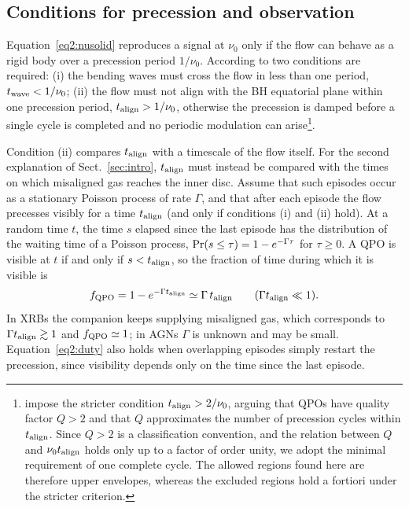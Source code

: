 \subsection{Conditions for precession and observation}
\label{sec:cond}

Equation~\eqref{eq2:nusolid} reproduces a signal at $\nu_0$ only if the flow can behave as a rigid body over a precession period $1/\nu_0$.
According to \citet{Motta2017} two conditions are required: 
(i) the bending waves must cross the flow in less than one period, $t_\textup{wave}<1/\nu_0$; 
(ii) the flow must not align with the BH equatorial plane within one precession period, $t_\textup{align}>1/\nu_0$, otherwise the precession is damped before a single cycle is completed and no periodic modulation can arise\footnote{\citet{Motta2017} impose the stricter condition $t_\textup{align}>2/\nu_0$, arguing that QPOs have quality factor $Q>2$ and that $Q$ approximates the number of precession cycles within $t_\textup{align}$. Since $Q>2$ is a classification convention, and the relation between $Q$ and $\nu_0 t_\textup{align}$ holds only up to a factor of order unity, we adopt the minimal requirement of one complete cycle. The allowed regions found here are therefore upper envelopes, whereas the excluded regions hold a fortiori under the stricter criterion.}.

Condition (ii) compares $t_\textup{align}$ with a timescale of the flow itself.
For the second explanation of Sect.~\ref{sec:intro}, $t_\textup{align}$ must instead be compared with the times on which misaligned gas reaches the inner disc.
Assume that such episodes occur as a stationary Poisson process of rate $\Gamma$, and that after each episode the flow precesses visibly for a time $t_\textup{align}$ (and only if conditions (i) and (ii) hold).
At a random time $t$, the time $s$ elapsed since the last episode has the distribution of the waiting time of a Poisson process, $\textup{Pr}(s\le\tau)=1-e^{-\Gamma\tau}$ for $\tau\ge0$.
A QPO is visible at $t$ if and only if $s<t_\textup{align}$, so the fraction of time during which it is visible is
\begin{equation}
    \label{eq2:duty}
    f_\textup{QPO}=1-e^{-\Gamma t_\textup{align}}\simeq\Gamma\,t_\textup{align}\qquad(\Gamma t_\textup{align}\ll1).
\end{equation}
In XRBs the companion keeps supplying misaligned gas, which corresponds to $\Gamma t_\textup{align}\gtrsim1$ and $f_\textup{QPO}\simeq1$; in AGNs $\Gamma$ is unknown and may be small.
Equation~\eqref{eq2:duty} also holds when overlapping episodes simply restart the precession, since visibility depends only on the time since the last episode.


